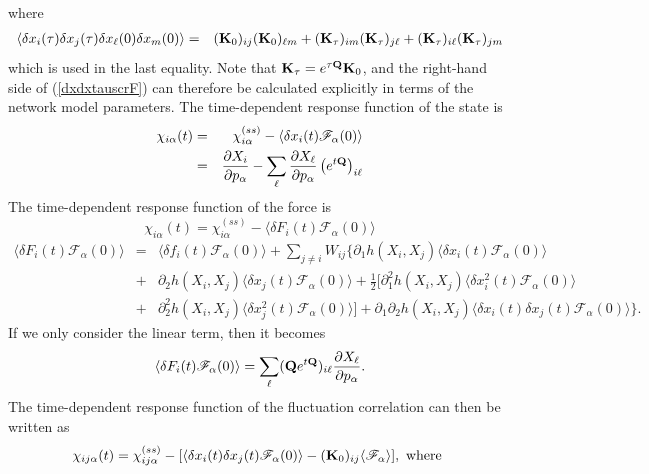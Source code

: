 where 
\begin{eqnarray}
\langle \delta x_i(\tau) \delta x_j (\tau)  \delta x_\ell(0) \delta x_m (0)\rangle
&=&({\bf K}_0)_{ij}({\bf K}_0)_{\ell m} + ({\bf K}_\tau)_{im}({\bf K}_\tau)_{j\ell }+ ({\bf K}_\tau)_{i\ell}({\bf K}_\tau)_{jm} \label{dx4tau}
\end{eqnarray}
which is used in the last equality. Note that ${\bf K}_\tau= e^{\tau{\bf Q}}{\bf K}_0$, and the right-hand side of (\ref{dxdxtauscrF}) can therefore be calculated explicitly in terms of the network model parameters.
The time-dependent response function of the state is
\begin{eqnarray}
    \chi_{i\alpha}(t) &=& \chi_{i\alpha}^{(ss)}-\langle \delta x_i(t) \mathscr{F}_\alpha(0) \rangle\\
    &=& \frac{\partial X_i}{\partial p_\alpha}
-\sum_{\ell} \frac{\partial X_\ell}{\partial p_\alpha}
\left( e^{t{\bf Q}} \right)_{i\ell}\nonumber
\end{eqnarray}
The time-dependent response function of the force is
\begin{equation}
    \chi_{i\alpha}(t)= \chi_{i\alpha}^{(ss)}-\langle \delta F_i(t) {\mathscr F}_\alpha(0)\rangle
\end{equation}
\begin{eqnarray}
\langle \delta {F}_i(t) \mathscr F_\alpha(0)\rangle&=& \langle \delta f_i(t)  {\mathscr F}_\alpha(0)\rangle +\sum_{j\neq i} W_{ij} \Biggl\{ \partial_1 h(X_i,X_j) \langle \delta x_i(t) {\mathscr F}_\alpha(0)\rangle \nonumber\\ &+&\partial_2h(X_i,X_j)\langle \delta x_j(t){\mathscr F}_\alpha(0)\rangle 
+\frac{1}{2} \Big[\partial_1^2h(X_i,X_j) \langle \delta x_i^2(t) {\mathscr F}_\alpha(0) \rangle\nonumber\\
&+& \partial_2^2h(X_i,X_j) \langle \delta x_j^2(t) {\mathscr F}_\alpha(0)\rangle \Big] +\partial_1 \partial_2h(X_i,X_j)\langle \delta x_i(t) \delta x_j(t) {\mathscr F}_\alpha(0)\rangle \Biggr\}.
\end{eqnarray}
If we only consider the linear term, then it becomes
\begin{equation}
    \langle \delta F_i(t) \mathscr{F}_\alpha(0) \rangle = \sum_{\ell} ({\bf Q}e^{t{\bf Q}})_{i\ell} \frac{\partial X_\ell}{\partial p_\alpha}.
\end{equation}
The time-dependent response function of the fluctuation correlation can then be written as
\begin{equation}
    \chi_{ij\alpha}(t)= \chi_{ij\alpha}^{(ss)}-[\langle \delta x_i(t) \delta x_j(t){\mathscr F}_\alpha(0)\rangle -({\bf K}_0)_{ij}\langle{\mathscr F}_\alpha\rangle ],\hbox{  where }
\end{equation}
